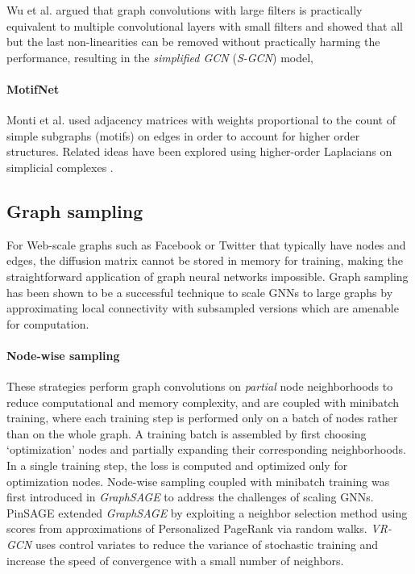 \documentclass{article}
\begin{document}
\noindent Wu et al. \cite{pmlr-v97-wu19e} argued that graph convolutions with large filters is practically equivalent to multiple convolutional layers with small filters and showed that all but the last non-linearities can be removed without practically harming the performance, resulting in the \emph{simplified GCN} (\textit{S-GCN}) model, 


\paragraph{MotifNet}
Monti et al. \cite{monti2018motifnet} used adjacency matrices with weights proportional to the count of simple subgraphs (motifs) on edges in order to account for higher order structures. Related ideas have been explored using higher-order Laplacians on simplicial complexes \cite{barbarossa2019topological}.

\subsection{Graph sampling} \label{sec:sampling}

For Web-scale graphs such as Facebook or Twitter that typically have  nodes and  edges, the diffusion matrix cannot be stored in memory for training, making the straightforward application of graph neural networks impossible. 
Graph sampling has been shown to be a successful technique to scale GNNs to large graphs by approximating local connectivity with subsampled versions which are amenable for computation. 

\paragraph{Node-wise sampling} These strategies perform graph convolutions on \emph{partial} node neighborhoods to reduce computational and memory complexity, and are coupled with minibatch training, where each training step is performed only on a batch of nodes rather than on  the whole graph. A training batch is assembled by first choosing  `optimization' nodes and partially expanding their corresponding neighborhoods. In a single training step, the loss is computed and optimized only for optimization nodes. 
Node-wise sampling coupled with minibatch training was first introduced in \textit{GraphSAGE} \cite{GraphSAGE} to address the challenges of scaling GNNs. PinSAGE \cite{pinsage} extended \textit{GraphSAGE} by exploiting a neighbor selection method using scores from approximations of Personalized PageRank \cite{haveliwala2003topic} via random walks. \textit{VR-GCN} \cite{stochastic-training} uses control variates to reduce the variance of  stochastic training and increase the speed of convergence with a small number of neighbors.
\end{document}
